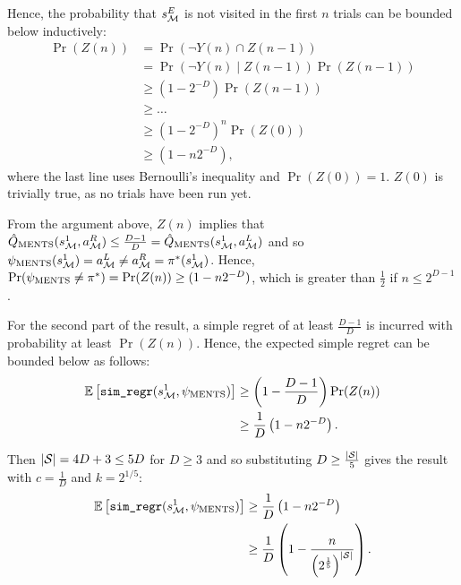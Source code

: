 \begin{proofoutline}
        Hence, the probability that $s^{E}_{\mathcal{M}}$ is not visited in the first $n$ trials can be bounded below inductively:
        \begin{align}
            \Pr(Z(n)) 
                &= \Pr\left(\neg Y(n) \cap Z(n-1)\right) \\
                &= \Pr\left(\neg Y(n) \middle| Z(n-1)\right) \Pr(Z(n-1)) \\
                &\geq (1-2^{-D}) \Pr(Z(n-1)) \\
                &\geq \ldots \\
                &\geq (1-2^{-D})^n \Pr(Z(0)) \\
                &\geq (1-n2^{-D}), \label{mbm:two}
        \end{align}
        where the last line uses Bernoulli's inequality and $\Pr(Z(0))=1$. $Z(0)$ is trivially true, as no trials have been run yet.
        
        From the argument above, $Z(n)$ implies that ${\hat{Q}_{{\textnormal{MENTS}}}}(s^{1}_{\mathcal{M}},a^R_{\mathcal{M}}) \leq \frac{D-1}{D} = {\hat{Q}_{{\textnormal{MENTS}}}}(s^{1}_{\mathcal{M}},a^L_{\mathcal{M}})$ and so $\psi_{{\textnormal{MENTS}}}(s^{1}_{\mathcal{M}}) = a^L_{\mathcal{M}} \neq a^R_{\mathcal{M}} = \pi^*(s^{1}_{\mathcal{M}})$. Hence, $\Pr(\psi_{{\textnormal{MENTS}}}\neq\pi^*) = \Pr(Z(n)) \geq (1-n2^{-D})$, which is greater than $\frac{1}{2}$ if $n\leq 2^{D-1}$.
        
        For the second part of the result, a simple regret of at least $\frac{D-1}{D}$ is incurred with probability at least $\Pr(Z(n))$. Hence,  the expected simple regret can be bounded below as follows:
        \begin{align}
            \mathbb{E}\left[{\textnormal{\texttt{sim\_regr}}}(s^{1}_{\mathcal{M}},\psi_{{\textnormal{MENTS}}})\right] 
                & \geq \left(1-\frac{D-1}{D}\right) \Pr(Z(n)) \\
                & \geq \frac{1}{D} \left( 1-n2^{-D} \right).
        \end{align}
        
        Then $|\mathcal{S}|=4D+3 \leq 5D$ for $D\geq 3$ and so substituting $D\geq \frac{|\mathcal{S}|}{5}$ gives the result with $c=\frac{1}{D}$ and $k=2^{1/5}$:
        \begin{align}
            \mathbb{E}\left[{\textnormal{\texttt{sim\_regr}}}(s^{1}_{\mathcal{M}},\psi_{{\textnormal{MENTS}}})\right]
                &\geq \frac{1}{D} \left( 1-n2^{-D} \right) \\
                &\geq \frac{1}{D} \left( 1-\frac{n}{\left(2^{\frac{1}{5}}\right)^{|\mathcal{S}|}} \right).
        \end{align}
    \end{proofoutline}










